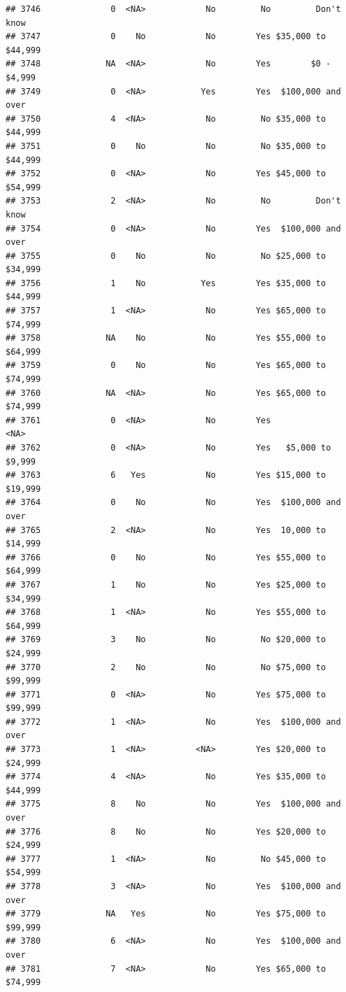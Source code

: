 \documentclass[man]{apa6}
\begin{document}
\begin{verbatim}
## 3746              0  <NA>            No         No         Don't know
## 3747              0    No            No        Yes $35,000 to $44,999
## 3748             NA  <NA>            No        Yes        $0 - $4,999
## 3749              0  <NA>           Yes        Yes  $100,000 and over
## 3750              4  <NA>            No         No $35,000 to $44,999
## 3751              0    No            No         No $35,000 to $44,999
## 3752              0  <NA>            No        Yes $45,000 to $54,999
## 3753              2  <NA>            No         No         Don't know
## 3754              0  <NA>            No        Yes  $100,000 and over
## 3755              0    No            No         No $25,000 to $34,999
## 3756              1    No           Yes        Yes $35,000 to $44,999
## 3757              1  <NA>            No        Yes $65,000 to $74,999
## 3758             NA    No            No        Yes $55,000 to $64,999
## 3759              0    No            No        Yes $65,000 to $74,999
## 3760             NA  <NA>            No        Yes $65,000 to $74,999
## 3761              0  <NA>            No        Yes               <NA>
## 3762              0  <NA>            No        Yes   $5,000 to $9,999
## 3763              6   Yes            No        Yes $15,000 to $19,999
## 3764              0    No            No        Yes  $100,000 and over
## 3765              2  <NA>            No        Yes  10,000 to $14,999
## 3766              0    No            No        Yes $55,000 to $64,999
## 3767              1    No            No        Yes $25,000 to $34,999
## 3768              1  <NA>            No        Yes $55,000 to $64,999
## 3769              3    No            No         No $20,000 to $24,999
## 3770              2    No            No         No $75,000 to $99,999
## 3771              0  <NA>            No        Yes $75,000 to $99,999
## 3772              1  <NA>            No        Yes  $100,000 and over
## 3773              1  <NA>          <NA>        Yes $20,000 to $24,999
## 3774              4  <NA>            No        Yes $35,000 to $44,999
## 3775              8    No            No        Yes  $100,000 and over
## 3776              8    No            No        Yes $20,000 to $24,999
## 3777              1  <NA>            No         No $45,000 to $54,999
## 3778              3  <NA>            No        Yes  $100,000 and over
## 3779             NA   Yes            No        Yes $75,000 to $99,999
## 3780              6  <NA>            No        Yes  $100,000 and over
## 3781              7  <NA>            No        Yes $65,000 to $74,999

\end{verbatim}
\end{document}
